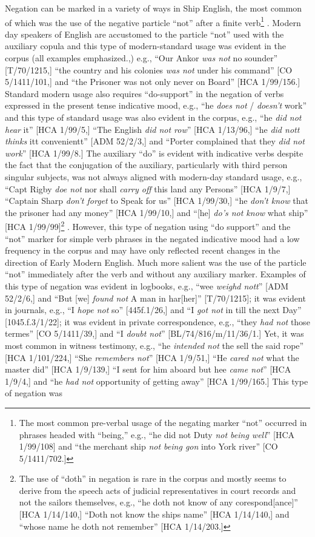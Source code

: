   Negation can be marked in a variety of ways in Ship English, the most common of which was the use of the negative particle “not” after a finite verb\footnote{The most common pre-verbal usage of the negating marker “not” occurred in phrases headed with “being,” e.g., “he did not Duty \textit{not being well}” [HCA 1/99/108] and “the merchant ship \textit{not being gon} into York river” [CO 5/1411/702.]} . Modern day speakers of English are accustomed to the particle “not” used with the auxiliary copula and this type of modern-standard usage was evident in the corpus (all examples emphasized.,) e.g., “Our Ankor \textit{was not} no sounder” [T/70/1215,] “the country and his colonies \textit{was not} under his command” [CO 5/1411/101,] and “the Prisoner was not only never on Board” [HCA 1/99/156.] Standard modern usage also requires “do-support” in the negation of verbs expressed in the present tense indicative mood, e.g., “he \textit{does not} / \textit{doesn’t} work” and this type of standard usage was also evident in the corpus, e.g., “he \textit{did not hear} it” [HCA 1/99/5,] “The English \textit{did not row}” [HCA 1/13/96,] “he \textit{did nott thinks} itt convenientt” [ADM 52/2/3,] and “Porter complained that they \textit{did not work}” [HCA 1/99/8.] The auxiliary “do” is evident with indicative verbs despite the fact that the conjugation of the auxiliary, particularly with third person singular subjects, was not always aligned with modern-day standard usage, e.g., “Capt Rigby \textit{doe not} nor shall \textit{carry off} this land any Persons” [HCA 1/9/7,] “Captain Sharp \textit{don’t forget} to Speak for us” [HCA 1/99/30,] “he \textit{don’t know} that the prisoner had any money” [HCA 1/99/10,] and “[he] \textit{do’s not know} what ship” [HCA 1/99/99]\footnote{The use of “doth” in negation is rare in the corpus and mostly seems to derive from the speech acts of judicial representatives in court records and not the sailors themselves, e.g., “he doth not know of any corespond[ance]” [HCA 1/14/140,] “Doth not know the ships name” [HCA 1/14/140,] and “whose name he doth not remember” [HCA 1/14/203.]} . However, this type of negation using “do support” and the “not” marker for simple verb phrases in the negated indicative mood had a low frequency in the corpus and may have only reflected recent changes in the direction of Early Modern English. Much more salient was the use of the particle “not” immediately after the verb and without any auxiliary marker. Examples of this type of negation was evident in logbooks, e.g., “wee \textit{weighd nott}” [ADM 52/2/6,] and “But [we] \textit{found not} A man in har[her]” [T/70/1215]; it was evident in journals, e.g., “I \textit{hope not} so” [445f.1/26,] and “I \textit{got not} in till the next Day” [1045.f.3/1/22]; it was evident in private correspondence, e.g., “they \textit{had not} those termes” [CO 5/1411/39,] and “I \textit{doubt not}” [BL/74/816/m/11/36/1.] Yet, it was most common in witness testimony, e.g., “he \textit{intended not} the sell the said rope” [HCA 1/101/224,] “She \textit{remembers not}” [HCA 1/9/51,] “He \textit{cared not} what the master did” [HCA 1/9/139,] “I sent for him aboard but hee \textit{came not}” [HCA 1/9/4,] and “he \textit{had not} opportunity of getting away” [HCA 1/99/165.] This type of negation was 